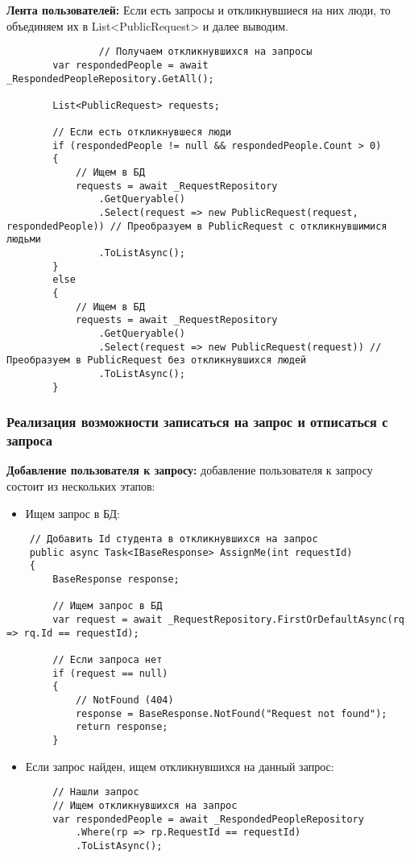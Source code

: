 \textbf{Лента пользователей:}  Если есть запросы и откликнувшиеся на них люди, то объединяем их в List<PublicRequest> и далее выводим.
\begin{verbatim}
				// Получаем откликнувшихся на запросы
        var respondedPeople = await _RespondedPeopleRepository.GetAll();

        List<PublicRequest> requests;

        // Если есть откликнувшеся люди
        if (respondedPeople != null && respondedPeople.Count > 0)
        {
            // Ищем в БД
            requests = await _RequestRepository
                .GetQueryable()
                .Select(request => new PublicRequest(request, respondedPeople)) // Преобразуем в PublicRequest с откликнувшимися людьми
                .ToListAsync();
        }
        else
        {
            // Ищем в БД
            requests = await _RequestRepository
                .GetQueryable()
                .Select(request => new PublicRequest(request)) // Преобразуем в PublicRequest без откликнувшихся людей
                .ToListAsync();
        }
\end{verbatim}

\subsubsection{Реализация возможности записаться на запрос и отписаться с запроса}

\textbf{Добавление пользователя к запросу:} добавление пользователя к запросу состоит из нескольких этапов:
\begin{itemize}
	\item{Ищем запрос в БД:}
\end{itemize}
\begin{verbatim}
    // Добавить Id студента в откликнувшихся на запрос
    public async Task<IBaseResponse> AssignMe(int requestId)
    {
        BaseResponse response;

        // Ищем запрос в БД
        var request = await _RequestRepository.FirstOrDefaultAsync(rq => rq.Id == requestId);

        // Если запроса нет
        if (request == null)
        {
            // NotFound (404)
            response = BaseResponse.NotFound("Request not found");
            return response;
        }

\end{verbatim}

\begin{itemize}
	\item{Если запрос найден, ищем откликнувшихся на данный запрос:}
\end{itemize}
\begin{verbatim}
        // Нашли запрос
        // Ищем откликнувшихся на запрос
        var respondedPeople = await _RespondedPeopleRepository
            .Where(rp => rp.RequestId == requestId)
            .ToListAsync();
\end{verbatim}


